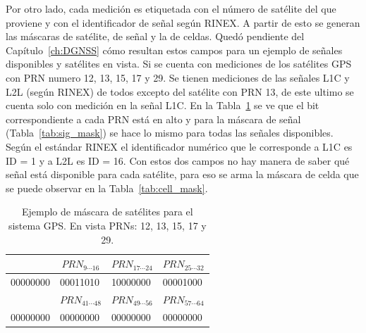 \documentclass[a4paper,12pt,oneside,onecolumn,final,openright]{book}%
\begin{document}
	Por otro lado, cada medición es etiquetada con el número de satélite del que proviene y con el identificador de señal según RINEX. A partir de esto se generan las máscaras de satélite, de señal y la de celdas. Quedó pendiente del Capítulo~\ref{ch:DGNSS} cómo resultan estos campos para un ejemplo de señales disponibles y satélites en vista. Si se cuenta con mediciones de los satélites GPS con PRN numero 12, 13, 15, 17 y 29. Se tienen mediciones de las señales L1C y L2L (según RINEX) de todos excepto del satélite con PRN 13, de este ultimo se cuenta solo con medición en la señal L1C. En la Tabla~\ref{tab:sat_mask} se ve que el bit correspondiente a cada PRN está en alto y para la máscara de señal (Tabla~\ref{tab:sig_mask}) se hace lo mismo para todas las señales disponibles. Según el estándar RINEX el identificador numérico que le corresponde a L1C es ID = 1 y a L2L es ID = 16. Con estos dos campos no hay manera de saber qué señal está disponible para cada satélite, para eso se arma la máscara de celda que se puede observar en la Tabla~\ref{tab:cell_mask}.
	
\begin{table}[]
\centering
\begin{tabular}{|l|l|l|l|}
\hline
\rowcolor[HTML]{9B9B9B} 
\multicolumn{1}{|c|}{\cellcolor[HTML]{9B9B9B}$PRN_{1\cdots 8}$}    & \multicolumn{1}{c|}{\cellcolor[HTML]{9B9B9B}$PRN_{9\cdots 16}$}    & \multicolumn{1}{c|}{\cellcolor[HTML]{9B9B9B}$PRN_{17\cdots 24}$} & \multicolumn{1}{c|}{\cellcolor[HTML]{9B9B9B}$PRN_{25\cdots 32}$} \\ \hline
00000000                                                 & 00011010                                                & 10000000                                                & 00001000                                                \\ \hline
\rowcolor[HTML]{9B9B9B} 
\multicolumn{1}{|c|}{\cellcolor[HTML]{9B9B9B}$PRN_{33\cdots 40}$} & \multicolumn{1}{c|}{\cellcolor[HTML]{9B9B9B}$PRN_{41\cdots 48}$} & \multicolumn{1}{c|}{\cellcolor[HTML]{9B9B9B}$PRN_{49\cdots 56}$} & \multicolumn{1}{c|}{\cellcolor[HTML]{9B9B9B}$PRN_{57\cdots 64}$} \\ \hline
00000000                                                 & 00000000                                                & 00000000                                                & 00000000                                                \\ \hline
\end{tabular}
\caption{Ejemplo de máscara de satélites para el sistema GPS. En vista PRNs: 12, 13, 15, 17 y 29.}
\label{tab:sat_mask}
\end{table}
\end{document}
